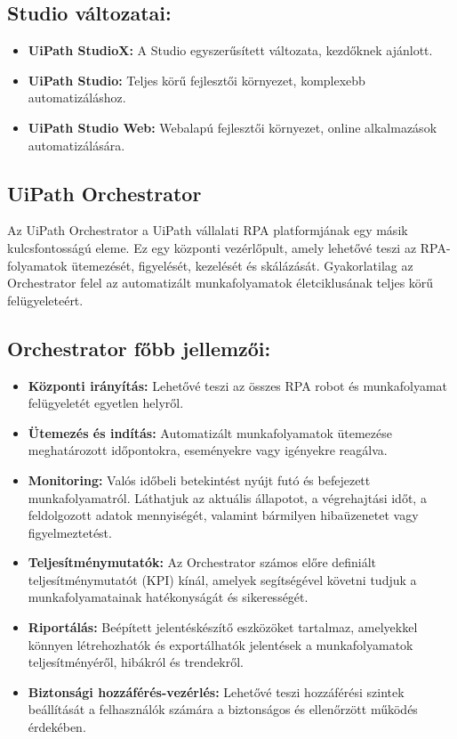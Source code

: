 \documentclass[
]{thesis-ekf}
\theoremstyle{definition}
\theoremstyle{remark}
\begin{document}
\subsection*{Studio változatai:}
	\begin{itemize}
		\item \textbf{UiPath StudioX:} A Studio egyszerűsített változata, kezdőknek ajánlott.
		\item \textbf{UiPath Studio:} Teljes körű fejlesztői környezet, komplexebb automatizáláshoz.
		\item \textbf{UiPath Studio Web:} Webalapú fejlesztői környezet, online alkalmazások automatizálására.
	\end{itemize}

	
\subsection{ UiPath Orchestrator \cite{Orchestrator}}
Az UiPath Orchestrator a UiPath vállalati RPA platformjának egy másik kulcsfontosságú eleme. Ez egy központi vezérlőpult, amely lehetővé teszi az RPA-folyamatok ütemezését, figyelését, kezelését és skálázását. Gyakorlatilag az Orchestrator felel az automatizált munkafolyamatok életciklusának teljes körű felügyeleteért.

\subsection*{Orchestrator főbb jellemzői:}
\begin{itemize}
		\item \textbf{Központi irányítás:} Lehetővé teszi az összes RPA robot és munkafolyamat felügyeletét egyetlen helyről.
		\item \textbf{Ütemezés és indítás:} Automatizált munkafolyamatok ütemezése meghatározott időpontokra, eseményekre vagy igényekre reagálva.
		\item \textbf{Monitoring:} Valós időbeli betekintést nyújt futó és befejezett munkafolyamatról. Láthatjuk az aktuális állapotot, a végrehajtási időt, a feldolgozott adatok mennyiségét, valamint bármilyen hibaüzenetet vagy figyelmeztetést.
		\item \textbf{Teljesítménymutatók:} Az Orchestrator számos előre definiált teljesítménymutatót (KPI) kínál, amelyek segítségével követni tudjuk a  munkafolyamatainak hatékonyságát és sikerességét.
		\item \textbf{Riportálás:} Beépített jelentéskészítő eszközöket tartalmaz, amelyekkel könnyen létrehozhatók és exportálhatók jelentések a munkafolyamatok teljesítményéről, hibákról és trendekről.
		\item \textbf{Biztonsági hozzáférés-vezérlés:} Lehetővé teszi hozzáférési szintek beállítását a felhasználók számára a biztonságos és ellenőrzött működés érdekében.
\end{itemize}
\end{document}
